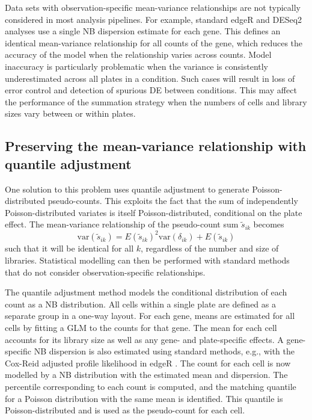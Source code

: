 \documentclass{article}
\begin{document}
Data sets with observation-specific mean-variance relationships are not typically considered in most analysis pipelines.
For example, standard edgeR and DESeq2 analyses use a single NB dispersion estimate for each gene.
This defines an identical mean-variance relationship for all counts of the gene, which reduces the accuracy of the model when the relationship varies across counts.
Model inaccuracy is particularly problematic when the variance is consistently underestimated across all plates in a condition.
Such cases will result in loss of error control and detection of spurious DE between conditions.
This may affect the performance of the summation strategy when the numbers of cells and library sizes vary between or within plates.

\subsection{Preserving the mean-variance relationship with quantile adjustment}
One solution to this problem uses quantile adjustment \cite{robinson2008small} to generate Poisson-distributed pseudo-counts.
This exploits the fact that the sum of independently Poisson-distributed variates is itself Poisson-distributed, conditional on the plate effect.
The mean-variance relationship of the pseudo-count sum $\tilde{s}_{ik}$ becomes 
\[
    \mbox{var}(\tilde{s}_{ik}) = E(\tilde{s}_{ik})^2 \mbox{var}(\delta_{ik}) + E(\tilde{s}_{ik}) 
\]
such that it will be identical for all $k$, regardless of the number and size of libraries.
Statistical modelling can then be performed with standard methods that do not consider observation-specific relationships.

The quantile adjustment method models the conditional distribution of each count as a NB distribution.
All cells within a single plate are defined as a separate group in a one-way layout.
For each gene, means are estimated for all cells by fitting a GLM to the counts for that gene.
The mean for each cell accounts for its library size as well as any gene- and plate-specific effects.
A gene-specific NB dispersion is also estimated using standard methods, e.g., with the Cox-Reid adjusted profile likelihood in edgeR \cite{mccarthy2012differential}.
The count for each cell is now modelled by a NB distribution with the estimated mean and dispersion.
The percentile corresponding to each count is computed, and the matching quantile for a Poisson distribution with the same mean is identified.
This quantile is Poisson-distributed and is used as the pseudo-count for each cell.
\end{document}
